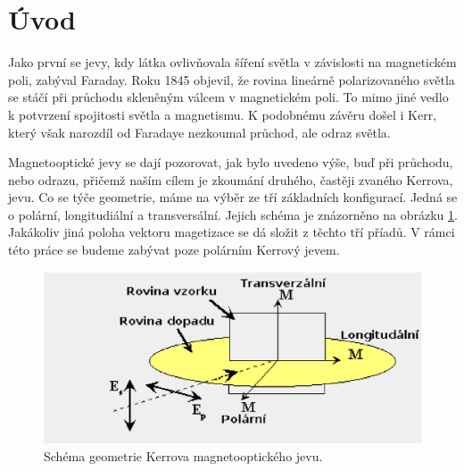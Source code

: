 \chapter*{Úvod}

Jako první se jevy, kdy látka ovlivňovala šíření světla v závislosti na magnetickém poli, zabýval Faraday. Roku 1845 objevil, že rovina lineárně polarizovaného světla se stáčí při průchodu skleněným válcem v magnetickém poli. To mimo jiné vedlo k potvrzení spojitosti světla a magnetismu. K podobnému závěru došel i Kerr, který však narozdíl od Faradaye nezkoumal průchod, ale odraz světla.

Magnetooptické jevy se dají pozorovat, jak bylo uvedeno výše, buď při průchodu, nebo odrazu, přičemž naším cílem je zkoumání druhého, 
častěji zvaného Kerrova, jevu. Co se týče geometrie, máme na výběr ze tří základních konfigurací. Jedná se o polární, longitudiální a 
transversální. Jejich schéma je znázorněno na obrázku \ref{schema geo}. Jakákoliv jiná poloha vektoru magetizace se dá 
složit z těchto tří příadů. V rámci této práce se budeme zabývat poze polárním Kerrový jevem.

\begin{figure}
\begin{center}
    \includegraphics[width=5in]{img/polar.eps}
\end{center}
    \caption{Schéma geometrie Kerrova magnetooptického jevu.}
    \label{schema geo}
\end{figure}

